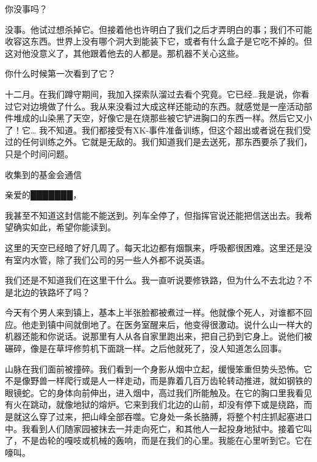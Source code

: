 \begin{scpbox}
你没事吗？

没事。他试过想杀掉它。但接着他也许明白了我们之后才弄明白的事；我们不可能收容这东西。世界上没有哪个洞大到能装下它，或者有什么盒子是它吃不掉的。但这对他没意义了，其他跟着他去的人都是。那机器不关心这些。

你什么时候第一次看到了它？

十二月。在我们蹲守期间，我加入探索队溜过去看个究竟。它已经…我是说，你看过它对边境做了什么。我从来没看过大成这样还能动的东西。就感觉是一座活动部件堆成的山染黑了天空，好像它是在烧那些被它铲进胸口的东西一样。然后它又小了！它… 我不知道。我们都接受有XK-事件准备训练，但这个超出或者说在我们受过的任何训练之外。它就是无敌的。我们知道我们是去送死，那东西要杀了我们，只是个时间问题。

\end{scpbox}

收集到的基金会通信 \\

\begin{scpbox}

亲爱的███████，

我甚至不知道这封信能不能送到。列车全停了，但指挥官说还能把信送出去。我希望确实如此，希望你能读到。

这里的天空已经暗了好几周了。每天北边都有烟飘来，呼吸都很困难。这里还是没有室内水管，除了我们公司的另一些人外都不说英语。

我们还是不知道我们在这里干什么。我一直听说要修铁路，但为什么不去北边？不是北边的铁路坏了吗？

\end{scpbox}

\begin{scpbox}

今天有个男人来到镇上，基本上半张脸都被煮过一样。他就像个死人，对谁都不回应。他走到镇中间就倒地了。在医务室醒来后，他变得很激动。说什么山一样大的机器还能和你说话。说那里有人从各自家里跑出来，把自己扔到它身上。说他们被碾碎，像是在草坪修剪机下面跳一样。之后他就死了，没人知道怎么回事。

\end{scpbox}

\begin{scpbox}

山脉在我们面前被撞碎。我们看到一个身影从烟中立起，缓慢笨重但势头恐怖。它不是像野兽一样爬行或是人一样走动，而是靠着几百万齿轮转动推进，就如钢铁的眼镜蛇。它的身体向前伸出，进入烟中，高过我们所能触及。在它的胸口里我看见有火在跳动，就像地狱的熔炉。它来到我们北边的山前，却没有停下或是绕路，而是就这么穿了过来，把山峰全部吞噬。它身处一条长胳膊，将整个村庄抓起塞进口中。我看到人们随家园被抹去一并走向死亡，和其他人一起投身地狱中。接着它叫了，不是齿轮的嘎吱或机械的轰响，而是在我们的心里。我能在心里听到它。它在嚎叫。

\end{scpbox}


